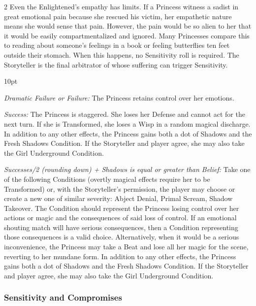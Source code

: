 \begin{multicols}{2}
Even the Enlightened's empathy has limits. If a Princess witness a sadist in great emotional pain because she rescued his victim, her empathetic nature means she would sense that pain. However, the pain would be so alien to her that it would be easily compartmentalized and ignored. Many Princesses compare this to reading about someone's feelings in a book or feeling butterflies ten feet outside their stomach. When this happens, no Sensitivity roll is required. The Storyteller is the final arbitrator of whose suffering can trigger Sensitivity. 

\begin{myindentpar}{10pt}    

\emph{Dramatic Failure or Failure:} The Princess retains control over her emotions.

\emph{Success:} The Princess is staggered. She loses her Defense and cannot act for the next turn. If she is Transformed, she loses a Wisp in a random magical discharge. In addition to any other effects, the Princess gains both a dot of Shadows and the Fresh Shadows Condition. If the Storyteller and player agree, she may also take the Girl Underground Condition. 

\emph{Successes/2 (rounding down) + Shadows is equal or greater than Belief:} Take one of the following Conditions (overtly magical effects require her to be Transformed) or, with the Storyteller's permission, the player may choose or create a new one of similar severity: Abject Denial, Primal Scream, Shadow Takeover. The Condition should represent the Princess losing control over her actions or magic and the consequences of said loss of control. If an emotional shouting match will have serious consequences, then a Condition representing those consequences is a valid choice. Alternatively, when it would be a serious inconvenience, the Princess may take a Beat and lose all her magic for the scene, reverting to her mundane form. In addition to any other effects, the Princess gains both a dot of Shadows and the Fresh Shadows Condition. If the Storyteller and player agree, she may also take the Girl Underground Condition. 

\end{myindentpar}

\begin{mybox}



\subsubsection*{Sensitivity and Compromises}


\end{mybox}
\end{multicols}
